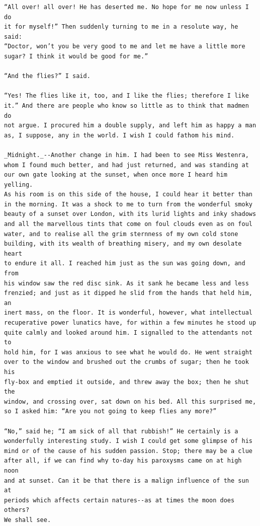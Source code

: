 \documentclass{article}
\begin{document}
\begin{verbatim}
“All over! all over! He has deserted me. No hope for me now unless I do
it for myself!” Then suddenly turning to me in a resolute way, he said:
“Doctor, won’t you be very good to me and let me have a little more
sugar? I think it would be good for me.”

“And the flies?” I said.

“Yes! The flies like it, too, and I like the flies; therefore I like
it.” And there are people who know so little as to think that madmen do
not argue. I procured him a double supply, and left him as happy a man
as, I suppose, any in the world. I wish I could fathom his mind.

_Midnight._--Another change in him. I had been to see Miss Westenra,
whom I found much better, and had just returned, and was standing at
our own gate looking at the sunset, when once more I heard him yelling.
As his room is on this side of the house, I could hear it better than
in the morning. It was a shock to me to turn from the wonderful smoky
beauty of a sunset over London, with its lurid lights and inky shadows
and all the marvellous tints that come on foul clouds even as on foul
water, and to realise all the grim sternness of my own cold stone
building, with its wealth of breathing misery, and my own desolate heart
to endure it all. I reached him just as the sun was going down, and from
his window saw the red disc sink. As it sank he became less and less
frenzied; and just as it dipped he slid from the hands that held him, an
inert mass, on the floor. It is wonderful, however, what intellectual
recuperative power lunatics have, for within a few minutes he stood up
quite calmly and looked around him. I signalled to the attendants not to
hold him, for I was anxious to see what he would do. He went straight
over to the window and brushed out the crumbs of sugar; then he took his
fly-box and emptied it outside, and threw away the box; then he shut the
window, and crossing over, sat down on his bed. All this surprised me,
so I asked him: “Are you not going to keep flies any more?”

“No,” said he; “I am sick of all that rubbish!” He certainly is a
wonderfully interesting study. I wish I could get some glimpse of his
mind or of the cause of his sudden passion. Stop; there may be a clue
after all, if we can find why to-day his paroxysms came on at high noon
and at sunset. Can it be that there is a malign influence of the sun at
periods which affects certain natures--as at times the moon does others?
We shall see.



\end{verbatim}
\end{document}
